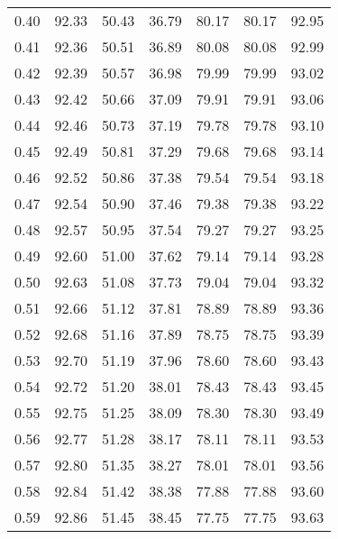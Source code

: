 \begin{tabular}{|c|c|c|c|c|c|c|}
      0.40 &     92.33 &     50.43 &      36.79 &   80.17 &      80.17 &         92.95 \\
      0.41 &     92.36 &     50.51 &      36.89 &   80.08 &      80.08 &         92.99 \\
      0.42 &     92.39 &     50.57 &      36.98 &   79.99 &      79.99 &         93.02 \\
      0.43 &     92.42 &     50.66 &      37.09 &   79.91 &      79.91 &         93.06 \\
      0.44 &     92.46 &     50.73 &      37.19 &   79.78 &      79.78 &         93.10 \\
      0.45 &     92.49 &     50.81 &      37.29 &   79.68 &      79.68 &         93.14 \\
      0.46 &     92.52 &     50.86 &      37.38 &   79.54 &      79.54 &         93.18 \\
      0.47 &     92.54 &     50.90 &      37.46 &   79.38 &      79.38 &         93.22 \\
      0.48 &     92.57 &     50.95 &      37.54 &   79.27 &      79.27 &         93.25 \\
      0.49 &     92.60 &     51.00 &      37.62 &   79.14 &      79.14 &         93.28 \\
      0.50 &     92.63 &     51.08 &      37.73 &   79.04 &      79.04 &         93.32 \\
      0.51 &     92.66 &     51.12 &      37.81 &   78.89 &      78.89 &         93.36 \\
      0.52 &     92.68 &     51.16 &      37.89 &   78.75 &      78.75 &         93.39 \\
      0.53 &     92.70 &     51.19 &      37.96 &   78.60 &      78.60 &         93.43 \\
      0.54 &     92.72 &     51.20 &      38.01 &   78.43 &      78.43 &         93.45 \\
      0.55 &     92.75 &     51.25 &      38.09 &   78.30 &      78.30 &         93.49 \\
      0.56 &     92.77 &     51.28 &      38.17 &   78.11 &      78.11 &         93.53 \\
      0.57 &     92.80 &     51.35 &      38.27 &   78.01 &      78.01 &         93.56 \\
      0.58 &     92.84 &     51.42 &      38.38 &   77.88 &      77.88 &         93.60 \\
      0.59 &     92.86 &     51.45 &      38.45 &   77.75 &      77.75 &         93.63 \\

\end{tabular}

